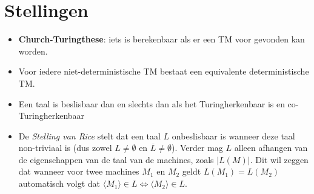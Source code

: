 \documentclass[]{article}
\begin{document}
\section*{Stellingen}
\begin{itemize}
	\item \textbf{Church-Turingthese}: iets is berekenbaar als er een TM voor gevonden kan worden.
	
	\item Voor iedere niet-deterministische TM bestaat een equivalente deterministische TM.
	
	\item Een taal is beslisbaar dan en slechts dan als het Turingherkenbaar is en co-Turingherkenbaar
	
	\item De \emph{Stelling van Rice} stelt dat een taal $L$ onbeslisbaar is wanneer deze taal non-triviaal is (dus zowel $L \neq \emptyset$ en $\overline{L} \neq \emptyset$). Verder mag $L$ alleen afhangen van de eigenschappen van de taal van de machines, zoals $|L(M)|$. Dit wil zeggen dat wanneer voor twee machines $M_1$ en $M_2$ geldt $L(M_1) = L(M_2)$ automatisch volgt dat $\langle M_1 \rangle \in L \Leftrightarrow \langle M_2 \rangle \in L$.
	
\end{itemize}
\end{document}
